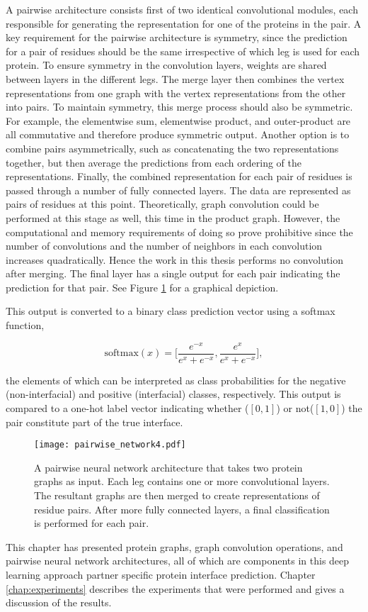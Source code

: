 A pairwise architecture consists first of two identical convolutional modules, each responsible for generating the representation for one of the proteins in the pair.
A key requirement for the pairwise architecture is symmetry, since the prediction for a pair of residues should be the same irrespective of which leg is used for each protein.
To ensure symmetry in the convolution layers, weights are shared between layers in the different legs.
The merge layer then combines the vertex representations from one graph with the vertex representations from the other into pairs.
To maintain symmetry, this merge process should also be symmetric.
For example, the elementwise sum, elementwise product, and outer-product are all commutative and therefore produce symmetric output.
Another option is to combine pairs asymmetrically, such as concatenating the two representations together, but then average the predictions from each ordering of the representations.
Finally, the combined representation for each pair of residues is passed through a number of fully connected layers.
The data are represented as pairs of residues at this point. 
Theoretically, graph convolution could be performed at this stage as well, this time in the product graph.
However, the computational and memory requirements of doing so prove prohibitive since the number of convolutions and the number of neighbors in each convolution increases quadratically.
Hence the work in this thesis performs no convolution after merging.
The final layer has a single output for each pair indicating the prediction for that pair.
See Figure \ref{fig:pairwise_arch1} for a graphical depiction.

This output is converted to a binary class prediction vector using a softmax function, 

\begin{equation}
\text{softmax}(x) = \bigg[ \frac{e^{-x}}{e^{x} + e^{-x}} , \frac{e^{x}}{e^{x} + e^{-x}} \bigg],
\label{eq:softmax}
\end{equation}

\noindent
the elements of which can be interpreted as class probabilities for the negative (non-interfacial) and positive (interfacial) classes, respectively.
This output is compared to a one-hot label vector indicating whether \big($[0, 1]$\big) or not\big($[1, 0]$\big) the pair constitute part of the true interface. 

\begin{figure}
	\texttt{[image: pairwise\_network4.pdf]}
	\caption{A pairwise neural network architecture that takes two protein graphs as input. Each leg contains one or more convolutional layers. The resultant graphs are then merged to create representations of residue pairs. After more fully connected layers, a final classification is performed for each pair.}
	\label{fig:pairwise_arch1}
\end{figure}


This chapter has presented protein graphs, graph convolution operations, and pairwise neural network architectures, all of which are components in this deep learning approach partner specific protein interface prediction.
Chapter \ref{chap:experiments} describes the experiments that were performed and gives a discussion of the results.
